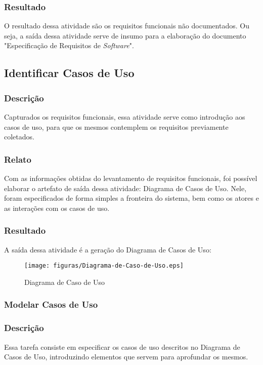 \subsubsection{Resultado}
O resultado dessa atividade são os requisitos funcionais não documentados. Ou seja, a saída dessa atividade serve de insumo para a elaboração do documento "Especificação de Requisitos de \textit{Software}".

\subsection{Identificar Casos de Uso}
\subsubsection{Descrição}
  Capturados os requisitos funcionais, essa atividade serve como introdução aos casos de uso, para que os mesmos contemplem os requisitos previamente coletados.

\subsubsection{Relato}
  Com as informações obtidas do levantamento de requisitos funcionais, foi possível elaborar o artefato de saída dessa atividade: Diagrama de Casos de Uso. Nele, foram especificados de forma simples a fronteira do sistema, bem como os atores e as interações com os casos de uso.

  \clearpage{}
  
  \subsubsection{Resultado}
  A saída dessa atividade é a geração do Diagrama de Casos de Uso:

  \begin{figure}[!ht]
  	\centering
  	\label{figura_Diagrama-de-Caso-de-Uso}
  		\texttt{[image: figuras/Diagrama-de-Caso-de-Uso.eps]}
  	\caption{Diagrama de Caso de Uso}
  \end{figure}


\subsubsection{Modelar Casos de Uso}
\subsubsection{Descrição}
  Essa tarefa consiste em especificar os casos de uso descritos no Diagrama de Casos de Uso, introduzindo elementos que servem para aprofundar os mesmos.

